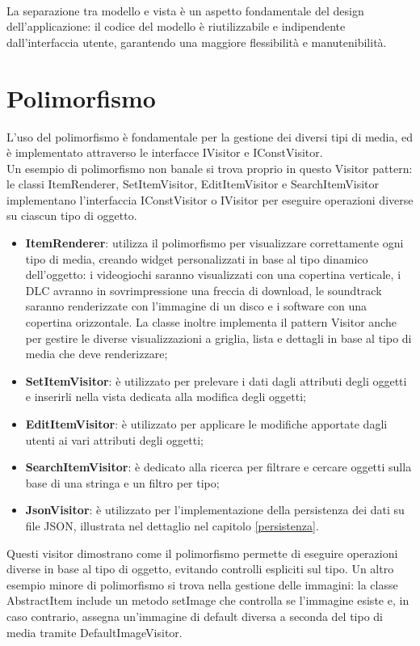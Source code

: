 \documentclass[10pt]{article}
\begin{document}
\\La separazione tra modello e vista è un aspetto fondamentale del design dell'applicazione: il codice del modello è riutilizzabile e indipendente dall'interfaccia utente, garantendo una maggiore flessibilità e manutenibilità.

\newpage
\section{Polimorfismo}
L'uso del polimorfismo è fondamentale per la gestione dei diversi tipi di media, ed è implementato attraverso le interfacce IVisitor e IConstVisitor.
\\Un esempio di polimorfismo non banale si trova proprio in questo Visitor pattern: le classi ItemRenderer, SetItemVisitor, EditItemVisitor e SearchItemVisitor implementano l'interfaccia IConstVisitor o IVisitor per eseguire operazioni diverse su ciascun tipo di oggetto.
\begin{itemize}
    \item \textbf{ItemRenderer}: utilizza il polimorfismo per visualizzare correttamente ogni tipo di media, creando widget personalizzati in base al tipo dinamico dell'oggetto: i videogiochi saranno visualizzati con una copertina verticale, i DLC avranno in sovrimpressione una freccia di download, le soundtrack saranno renderizzate con l'immagine di un disco e i software con una copertina orizzontale. La classe inoltre implementa il pattern Visitor anche per gestire le diverse visualizzazioni a griglia, lista e dettagli in base al tipo di media che deve renderizzare;
    \item \textbf{SetItemVisitor}: è utilizzato per prelevare i dati dagli attributi degli oggetti e inserirli nella vista dedicata alla modifica degli oggetti;
    \item \textbf{EditItemVisitor}: è utilizzato per applicare le modifiche apportate dagli utenti ai vari attributi degli oggetti;
    \item \textbf{SearchItemVisitor}: è dedicato alla ricerca per filtrare e cercare oggetti sulla base di una stringa e un filtro per tipo;
    \item \textbf{JsonVisitor}: è utilizzato per l'implementazione della persistenza dei dati su file JSON, illustrata nel dettaglio nel capitolo \ref{persistenza}.
\end{itemize}
Questi visitor dimostrano come il polimorfismo permette di eseguire operazioni diverse in base al tipo di oggetto, evitando controlli espliciti sul tipo. Un altro esempio minore di polimorfismo si trova nella gestione delle immagini: la classe AbstractItem include un metodo setImage che controlla se l'immagine esiste e, in caso contrario, assegna un'immagine di default diversa a seconda del tipo di media tramite DefaultImageVisitor.
\end{document}
